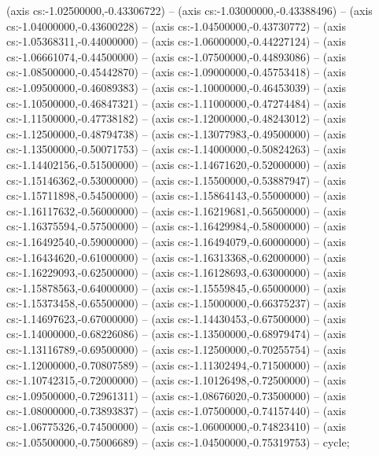 (axis cs:-1.02500000,-0.43306722) -- (axis cs:-1.03000000,-0.43388496) -- (axis cs:-1.04000000,-0.43600228) -- (axis cs:-1.04500000,-0.43730772) -- (axis cs:-1.05368311,-0.44000000) -- (axis cs:-1.06000000,-0.44227124) -- (axis cs:-1.06661074,-0.44500000) -- (axis cs:-1.07500000,-0.44893086) -- (axis cs:-1.08500000,-0.45442870) -- (axis cs:-1.09000000,-0.45753418) -- (axis cs:-1.09500000,-0.46089383) -- (axis cs:-1.10000000,-0.46453039) -- (axis cs:-1.10500000,-0.46847321) -- (axis cs:-1.11000000,-0.47274484) -- (axis cs:-1.11500000,-0.47738182) -- (axis cs:-1.12000000,-0.48243012) -- (axis cs:-1.12500000,-0.48794738) -- (axis cs:-1.13077983,-0.49500000) -- (axis cs:-1.13500000,-0.50071753) -- (axis cs:-1.14000000,-0.50824263) -- (axis cs:-1.14402156,-0.51500000) -- (axis cs:-1.14671620,-0.52000000) -- (axis cs:-1.15146362,-0.53000000) -- (axis cs:-1.15500000,-0.53887947) -- (axis cs:-1.15711898,-0.54500000) -- (axis cs:-1.15864143,-0.55000000) -- (axis cs:-1.16117632,-0.56000000) -- (axis cs:-1.16219681,-0.56500000) -- (axis cs:-1.16375594,-0.57500000) -- (axis cs:-1.16429984,-0.58000000) -- (axis cs:-1.16492540,-0.59000000) -- (axis cs:-1.16494079,-0.60000000) -- (axis cs:-1.16434620,-0.61000000) -- (axis cs:-1.16313368,-0.62000000) -- (axis cs:-1.16229093,-0.62500000) -- (axis cs:-1.16128693,-0.63000000) -- (axis cs:-1.15878563,-0.64000000) -- (axis cs:-1.15559845,-0.65000000) -- (axis cs:-1.15373458,-0.65500000) -- (axis cs:-1.15000000,-0.66375237) -- (axis cs:-1.14697623,-0.67000000) -- (axis cs:-1.14430453,-0.67500000) -- (axis cs:-1.14000000,-0.68226086) -- (axis cs:-1.13500000,-0.68979474) -- (axis cs:-1.13116789,-0.69500000) -- (axis cs:-1.12500000,-0.70255754) -- (axis cs:-1.12000000,-0.70807589) -- (axis cs:-1.11302494,-0.71500000) -- (axis cs:-1.10742315,-0.72000000) -- (axis cs:-1.10126498,-0.72500000) -- (axis cs:-1.09500000,-0.72961311) -- (axis cs:-1.08676020,-0.73500000) -- (axis cs:-1.08000000,-0.73893837) -- (axis cs:-1.07500000,-0.74157440) -- (axis cs:-1.06775326,-0.74500000) -- (axis cs:-1.06000000,-0.74823410) -- (axis cs:-1.05500000,-0.75006689) -- (axis cs:-1.04500000,-0.75319753) -- cycle;
